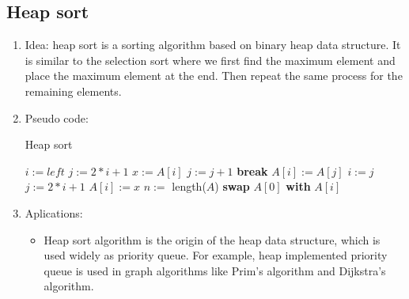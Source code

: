 \documentclass[12pt]{article}
\begin{document}
    \subsection{Heap sort}
    \begin{enumerate}
        \item Idea: heap sort is a sorting algorithm based on binary heap data structure. It is similar to the selection sort where we first find the maximum element and place the maximum element at the end. Then repeat the same process for the remaining elements.
        \item Pseudo code:
        \begin{algorithm}[H]
            \caption{Heap sort}
            \begin{algorithmic}[1]
                    \State $i:=\textit{left}$
                    \State $j:=2*i+1$
                    \State $x:=A[i]$
                        \State $j:=j+1$
                        \EndIf
                        \State \textbf{break}
                        \EndIf
                        \State $A[i]:=A[j]$
                        \State $i:=j$
                        \State $j:=2*i+1$
                    \EndWhile
                    \State $A[i]:=x$
                \EndFunction
                \State
                    \State $n:=$ length($A$)
                        \State {}
                    \EndFor
                        \State \textbf{swap} $A[0]$ \textbf{with} $A[i]$
                        \State {} 
                    \EndFor
                \EndFunction
            \end{algorithmic}
        \end{algorithm}
        \item Aplications:
        \begin{itemize}
            \item Heap sort algorithm is the origin of the heap data structure, which is used widely as priority queue. For example, heap implemented priority queue is used in graph algorithms like Prim's algorithm and Dijkstra's algorithm.
        \end{itemize}

\end{enumerate}
\end{document}
